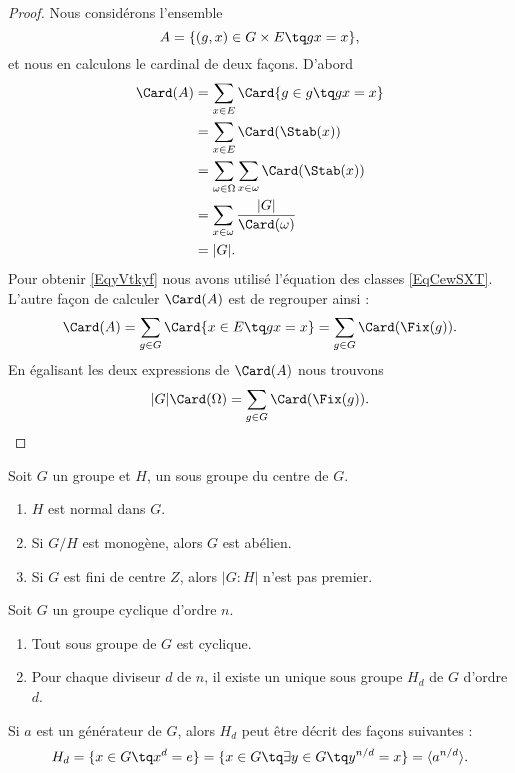 \begin{proof}
    Nous considérons l'ensemble 
    \begin{equation}
        A=\{ (g,x)\in G\times E\tq gx=x \},
    \end{equation}
    et nous en calculons le cardinal de deux façons. D'abord
    \begin{subequations}
        \begin{align}
            \Card(A)&=\sum_{x\in E}\Card\{ g\in g\tq gx=x \}\\
            &=\sum_{x\in E}\Card(\Stab(x))\\
            &=\sum_{\omega\in \Omega}\sum_{x\in \omega}\Card(\Stab(x))\\
            &=\sum_{x\in \omega}\frac{ | G | }{ \Card(\omega) }     \label{EqyVtkyf}\\
            &=| G |.
        \end{align}
    \end{subequations}
    Pour obtenir \eqref{EqyVtkyf} nous avons utilisé l'équation des classes \eqref{EqCewSXT}. L'autre façon de calculer \( \Card(A)\) est de regrouper ainsi :
    \begin{equation}
        \Card(A)=\sum_{g\in G}\Card\{ x\in E\tq gx=x \}=\sum_{g\in G}\Card(\Fix(g)).
    \end{equation}
    En égalisant les deux expressions de \( \Card(A)\) nous trouvons
    \begin{equation}
        | G |\Card(\Omega)=\sum_{g\in G}\Card(\Fix(g)).
    \end{equation}
\end{proof}

\begin{proposition}
    Soit \( G\) un groupe et \( H\), un sous groupe du centre de \( G\).
    \begin{enumerate}
        \item
            \( H\) est normal dans \( G\).
        \item
            Si \( G/H\) est monogène, alors \( G\) est abélien.
        \item
            Si \( G\) est fini de centre \( Z\), alors \( | G:H |\) n'est pas premier.
    \end{enumerate}
\end{proposition}

\begin{theorem}
    Soit \( G\) un groupe cyclique d'ordre \( n\).
    \begin{enumerate}
        \item
            Tout sous groupe de \( G\) est cyclique.
        \item 
            Pour chaque diviseur \( d\) de \( n\), il existe un unique sous groupe \( H_d\) de \( G\) d'ordre \( d\).
    \end{enumerate}
    Si \( a\) est un générateur de \( G\), alors \( H_d\) peut être décrit des façons suivantes :
    \begin{equation}
        H_d=\{ x\in G\tq x^d=e \}=\{ x\in G\tq\exists y\in G\tq y^{n/d}=x \}=\langle a^{n/d}\rangle.
    \end{equation}
\end{theorem}

